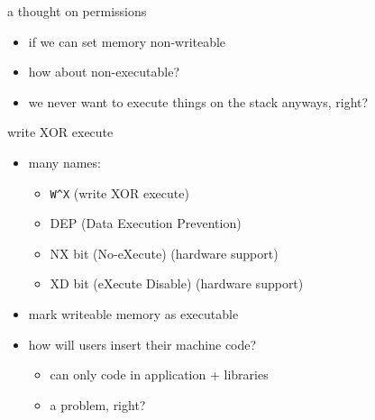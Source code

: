\begin{frame}{a thought on permissions}
    \begin{itemize}
    \item if we can set memory non-writeable
    \item how about non-executable?
    \vspace{.5cm}
    \item we never want to execute things on the stack anyways, right?
    \end{itemize}
\end{frame}


\begin{frame}[fragile,label=wxorx]{write XOR execute}
    \begin{itemize}
    \item many names:
    \begin{itemize}
        \item \verb|W^X| (write XOR execute)
        \item DEP (Data Execution Prevention)
        \item NX bit (No-eXecute) (hardware support)
        \item XD bit (eXecute Disable) (hardware support)
    \end{itemize}
    \item mark writeable memory as executable
    \item how will users insert their machine code?
        \begin{itemize}
        \item can only code in application + libraries
        \item a problem, right?
        \end{itemize}
    \end{itemize}
\end{frame}

